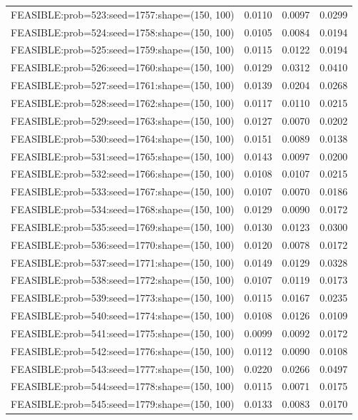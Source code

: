 \begin{longtable}{lccc}
FEASIBLE:prob=523:seed=1757:shape=(150, 100) &   0.0110 & 0.0097 & 0.0299 \\
FEASIBLE:prob=524:seed=1758:shape=(150, 100) &   0.0105 & 0.0084 & 0.0194 \\
FEASIBLE:prob=525:seed=1759:shape=(150, 100) &   0.0115 & 0.0122 & 0.0194 \\
FEASIBLE:prob=526:seed=1760:shape=(150, 100) &   0.0129 & 0.0312 & 0.0410 \\
FEASIBLE:prob=527:seed=1761:shape=(150, 100) &   0.0139 & 0.0204 & 0.0268 \\
FEASIBLE:prob=528:seed=1762:shape=(150, 100) &   0.0117 & 0.0110 & 0.0215 \\
FEASIBLE:prob=529:seed=1763:shape=(150, 100) &   0.0127 & 0.0070 & 0.0202 \\
FEASIBLE:prob=530:seed=1764:shape=(150, 100) &   0.0151 & 0.0089 & 0.0138 \\
FEASIBLE:prob=531:seed=1765:shape=(150, 100) &   0.0143 & 0.0097 & 0.0200 \\
FEASIBLE:prob=532:seed=1766:shape=(150, 100) &   0.0108 & 0.0107 & 0.0215 \\
FEASIBLE:prob=533:seed=1767:shape=(150, 100) &   0.0107 & 0.0070 & 0.0186 \\
FEASIBLE:prob=534:seed=1768:shape=(150, 100) &   0.0129 & 0.0090 & 0.0172 \\
FEASIBLE:prob=535:seed=1769:shape=(150, 100) &   0.0130 & 0.0123 & 0.0300 \\
FEASIBLE:prob=536:seed=1770:shape=(150, 100) &   0.0120 & 0.0078 & 0.0172 \\
FEASIBLE:prob=537:seed=1771:shape=(150, 100) &   0.0149 & 0.0129 & 0.0328 \\
FEASIBLE:prob=538:seed=1772:shape=(150, 100) &   0.0107 & 0.0119 & 0.0173 \\
FEASIBLE:prob=539:seed=1773:shape=(150, 100) &   0.0115 & 0.0167 & 0.0235 \\
FEASIBLE:prob=540:seed=1774:shape=(150, 100) &   0.0108 & 0.0126 & 0.0109 \\
FEASIBLE:prob=541:seed=1775:shape=(150, 100) &   0.0099 & 0.0092 & 0.0172 \\
FEASIBLE:prob=542:seed=1776:shape=(150, 100) &   0.0112 & 0.0090 & 0.0108 \\
FEASIBLE:prob=543:seed=1777:shape=(150, 100) &   0.0220 & 0.0266 & 0.0497 \\
FEASIBLE:prob=544:seed=1778:shape=(150, 100) &   0.0115 & 0.0071 & 0.0175 \\
FEASIBLE:prob=545:seed=1779:shape=(150, 100) &   0.0133 & 0.0083 & 0.0170 \\

\end{longtable}

